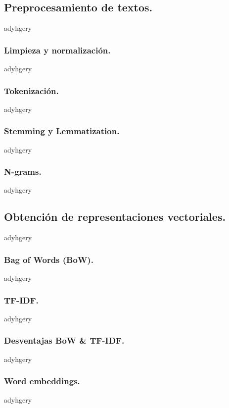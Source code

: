 \documentclass[12pt,a4paper]{article}
\begin{document}
\begin{sloppypar}
\subsection{Preprocesamiento de textos.}\label{Proces_textos}
adyhgery
\cleardoublepage

\subsubsection{Limpieza y normalización.}\label{Limpieza_y_norm}
adyhgery
\cleardoublepage

\subsubsection{Tokenización.}\label{tokenizacion}
adyhgery
\cleardoublepage

\subsubsection{Stemming y Lemmatization.}\label{stem_y_lem}
adyhgery
\cleardoublepage

\subsubsection{N-grams.}\label{ngrams}
adyhgery
\cleardoublepage

\subsection{Obtención de representaciones vectoriales.}\label{rep_vect}
adyhgery
\cleardoublepage

\subsubsection{Bag of Words (BoW).}\label{bow}
adyhgery
\cleardoublepage

\subsubsection{TF-IDF.}\label{tf_idf}
adyhgery
\cleardoublepage

\subsubsection{Desventajas BoW \& TF-IDF.}\label{desv_bow_tfidf}
adyhgery
\cleardoublepage

\subsubsection{Word embeddings.}\label{word_emb}
adyhgery
\cleardoublepage


\end{sloppypar}
\end{document}
